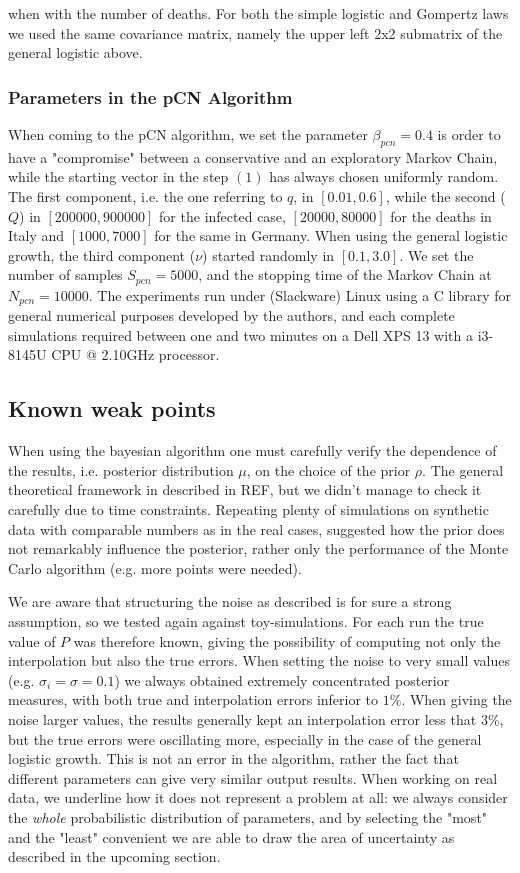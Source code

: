 \documentclass[8pt]{article}
\begin{document}
when with the number of deaths.
For both the simple logistic and Gompertz laws
we used the same covariance matrix, namely the upper left 2x2 submatrix
of the general logistic above.


\subsubsection{Parameters in the pCN Algorithm}
When coming to the pCN algorithm, we set the parameter $\beta_{pcn} = 0.4$
is order to have a "compromise" between a conservative and an
exploratory Markov Chain, while the starting vector in the step $(1)$
has always chosen uniformly random. The first component, i.e.
the one referring to $q$, in $[0.01, 0.6]$, while the second ($Q$) in
$[200000,900000]$ for the infected case, $[20000,80000]$ for the
deaths in Italy and $[1000,7000]$ for the same in Germany.
When using the general logistic growth, the third component
($\nu$) started randomly in $[0.1, 3.0]$.
We set the number of samples $S_{pcn} = 5000$, and the stopping
time of the Markov Chain at $N_{pcn} = 10000$. 
The experiments run under (Slackware) Linux
using a C library for general numerical purposes developed by the authors,
and each complete simulations required between one and two
minutes on a Dell XPS 13 with a i3-8145U CPU @ 2.10GHz processor.


\subsection{Known weak points}
When using the bayesian algorithm one must carefully verify the dependence
of the results, i.e. posterior distribution $\mu$, on the choice of
the prior $\rho$. The general theoretical framework in described in REF,
but we didn't manage to check it carefully due to time constraints.
Repeating plenty of simulations on synthetic data with comparable
numbers as in the real cases,
suggested how the prior does not remarkably influence the posterior,
rather only the performance of the Monte Carlo algorithm
(e.g. more points were needed).


We are aware that structuring the noise as described 
is for sure a strong assumption,
so we tested again against toy-simulations.
For each run the true value of $P$
was therefore known, giving the possibility of computing not only the 
interpolation but also the true errors.
When setting the noise to very small values (e.g. $\sigma_i = \sigma = 0.1$)
we always obtained extremely concentrated posterior measures, with
both true and interpolation errors inferior to $1\%$. When giving the noise
larger values, the results generally kept an interpolation error
less that $3\%$, but the true errors were oscillating more, especially
in the case of the general logistic growth. This is not an error in the
algorithm, rather the fact that different parameters can give very
similar output results. When working on real data, we underline how
it does not represent a problem at all: we always consider the
\emph{whole} probabilistic distribution of parameters,
and by selecting the "most" and the "least" convenient we are able
to draw the area of uncertainty as described in the upcoming section.
\end{document}
